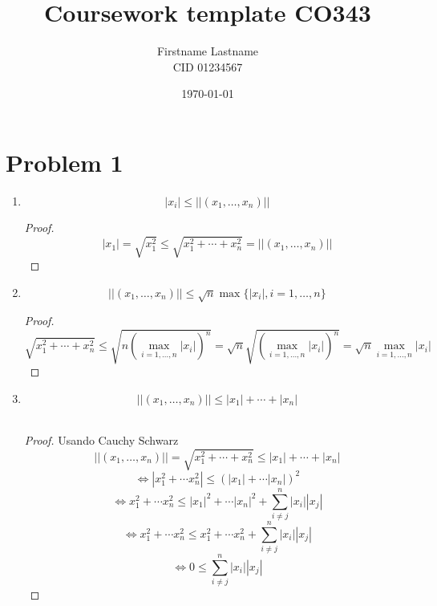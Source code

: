 \documentclass{article}
\title{Coursework template CO343}
\author{Firstname Lastname \\ CID 01234567}
\date{\today}
\begin{document}
\maketitle

\section{Problem 1}
\begin{enumerate}
    \item \[ |x_i| \leq ||(x_1,\ldots,x_n)|| \]
    \begin{proof}
        \[|x_1| = \sqrt{x_1^2} \leq \sqrt{x_1^2+\cdots+x_n^2}=||(x_1,\ldots,x_n)||\]
    \end{proof} 
    \item \[||(x_1,\ldots,x_n)|| \leq \sqrt{n}\max\{|x_i|,i=1,\ldots,n\}\]
    \begin{proof}
        \[\sqrt{x_1^2+\cdots+x_n^2} \leq \sqrt{n(\max_{i=1,\ldots,n}|x_i|)^n}=\sqrt{n}
        \sqrt{(\max_{i=1,\ldots,n}|x_i|)^n} =\sqrt{n}\max_{i=1,\ldots,n}|x_i|\]
    \end{proof}
    \item \[||(x_1,\ldots,x_n)|| \leq |x_1|+\cdots+|x_n|\]\
    \begin{proof} Usando Cauchy Schwarz
        \[||(x_1,\ldots,x_n)|| = \sqrt{x_1^2+\cdots+x_n^2}\leq |x_1|+\cdots+|x_n|\]
        \[\iff |x_1^2+\cdots x_n^2| \leq (|x_1|+\cdots|x_n|)^2 \]
        \[\iff x_1^2+\cdots x_n^2 \leq |x_1|^2+\cdots|x_n|^2 + 
        \sum_{i\neq j}^{n}|x_i||x_j|\]
        \[\iff x_1^2+\cdots x_n^2 \leq x_1^2+\cdots x_n^2 + 
        \sum_{i\neq j}^{n}|x_i||x_j|\]
        \[\iff 0 \leq \sum_{i\neq j}^{n}|x_i||x_j|\]
        

        

    \end{proof}
\end{enumerate}
\end{document}

